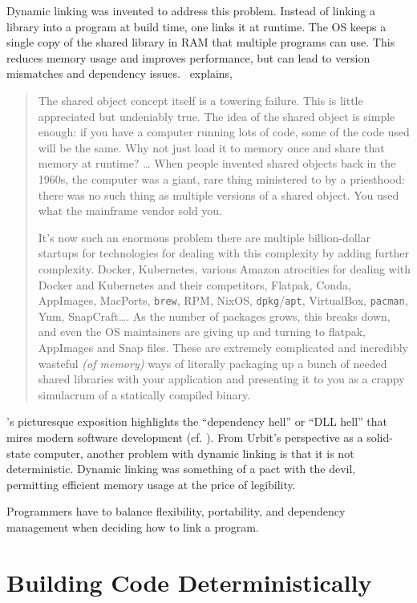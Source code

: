 \documentclass[twoside]{article}
\begin{document}
Dynamic linking was invented to address this problem.  Instead of linking a library into a program at build time, one links it at runtime.  The OS keeps a single copy of the shared library in RAM that multiple programs can use.  This reduces memory usage and improves performance, but can lead to version mismatches and dependency issues.  \citeauthor{Locklin2022}~explains,

\begin{quote}
The shared object concept itself is a towering failure. This is little appreciated but undeniably true. The idea of the shared object is simple enough: if you have a computer running lots of code, some of the code used will be the same. Why not just load it to memory once and share that memory at runtime? … When people invented shared objects back in the 1960s, the computer was a giant, rare thing ministered to by a priesthood: there was no such thing as multiple versions of a shared object. You used what the mainframe vendor sold you.

It’s now such an enormous problem there are multiple billion-dollar startups for technologies for dealing with this complexity by adding further complexity. Docker, Kubernetes, various Amazon atrocities for dealing with Docker and Kubernetes and their competitors, Flatpak, Conda, AppImages, MacPorts, \texttt{brew}, RPM, NixOS, \texttt{dpkg}/\texttt{apt}, VirtualBox, \texttt{pacman}, Yum, SnapCraft…. As the number of packages grows, this breaks down, and even the OS maintainers are giving up and turning to flatpak, AppImages and Snap files. 
These are extremely complicated and incredibly wasteful \emph{(of memory)} ways of literally packaging up a bunch of needed shared libraries with your application and presenting it to you as a crappy simulacrum of a statically compiled binary.  \citep{Locklin2022}
\end{quote}

\noindent
\citeauthor{Locklin2022}'s picturesque exposition highlights the “dependency hell” or “DLL hell” that mires modern software development (cf. \citet{Grimes2003}).  From Urbit's perspective as a solid-state computer, another problem with dynamic linking is that it is not deterministic.  Dynamic linking was something of a pact with the devil, permitting efficient memory usage at the price of legibility.

Programmers have to balance flexibility, portability, and dependency management when deciding how to link a program.


\section{Building Code Deterministically}
\end{document}

